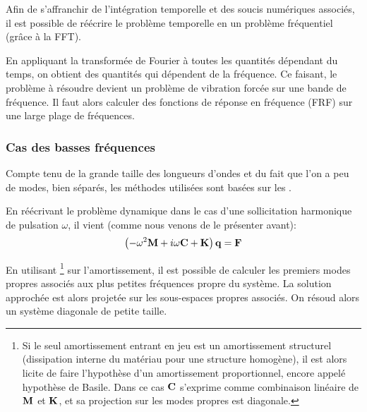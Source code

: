 Afin de s'affranchir de l'intégration temporelle et des soucis numériques associés, il est
possible de réécrire le problème temporelle en un problème fréquentiel (grâce à 
la FFT).


\medskip
En appliquant la transformée de Fourier
à toutes les quantités dépendant du temps,
on obtient des quantités qui dépendent de la fréquence.
Ce faisant, le problème à résoudre devient un problème de vibration
forcée sur une bande de fréquence.
Il faut alors calculer des fonctions de réponse en fréquence (FRF) sur une large plage
de fréquences.

\medskip
\subsubsection{Cas des basses fréquences}

Compte tenu de la grande taille des longueurs d'ondes et du fait que l'on a peu de modes, bien séparés,
les méthodes utilisées sont basées sur les .

En réécrivant le problème dynamique dans le cas d'une sollicitation harmonique de pulsation
$\omega$, il vient (comme nous venons de le présenter avant):
\begin{equation}
\left(-\omega^2\MM{M}+i\omega \MM{C}+\MM{K}\right)\VV{q} = \VV{F}
\end{equation}

En utilisant \footnote{%
Si le seul amortissement entrant en jeu est un amortissement structurel (dissipation
interne du matériau pour une structure homogène), il est alors licite de faire
l'hypothèse d'un amortissement proportionnel, encore appelé hypothèse de
Basile. Dans ce cas $\MM{C}$ s'exprime comme combinaison linéaire de $\MM{M}$ et $\MM{K}$,
et sa projection sur les modes propres est diagonale.
} sur l'amortissement, il est possible de calculer les premiers modes propres 
associés aux plus petites fréquences propre du système.
La solution approchée est alors projetée sur les sous-espaces propres associés.
On résoud alors un système diagonale de petite taille.

